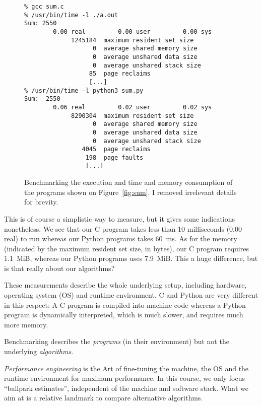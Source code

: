 \documentclass{aldast}
\begin{document}
\begin{figure}[htbp]
  \begin{verbatim}
% gcc sum.c
% /usr/bin/time -l ./a.out
Sum: 2550
        0.00 real         0.00 user         0.00 sys
             1245184  maximum resident set size
                   0  average shared memory size
                   0  average unshared data size
                   0  average unshared stack size
                  85  page reclaims
                  [...]
% /usr/bin/time -l python3 sum.py
Sum:  2550
        0.06 real         0.02 user         0.02 sys
             8290304  maximum resident set size
                   0  average shared memory size
                   0  average unshared data size
                   0  average unshared stack size
                4045  page reclaims
                 198  page faults
                 [...]
 \end{verbatim}
 \caption{Benchmarking the execution and time and memory consumption
   of the programs shown on Figure~\ref{fig:sum}. I removed irrelevant
   details for brevity.}
 \label{sh:benchmark}
\end{figure}

This is of course a simplistic way to measure, but it gives some
indications nonetheless. We see that our C program takes less than 10
milliseconds (0.00 real) to run whereas our Python programs takes
60~ms. As for the memory (indicated by
the maximum resident set size, in bytes), our C program requires
1.1~MiB, whereas our Python programs uses 7.9~MiB. This a huge
difference, but is that really about our algorithms?

These measurements describe the whole underlying setup, including
hardware, operating system (OS) and runtime environment. C and Python are
very different in this respect: A C program is compiled into machine
code whereas a Python program is dynamically interpreted, which is
much slower, and requires much more memory.

\begin{takeaway}
  Benchmarking describes the \emph{programs} (in their environment)
  but not the underlying \emph{algorithms}.
\end{takeaway}

\emph{Performance engineering} is the Art of fine-tuning the machine,
the OS and the runtime environment for maximum performance. In this
course, we only focus ``ballpark estimates'', independent of the
machine and software stack. What we aim at is a relative landmark to
compare alternative algorithms.
\end{document}
